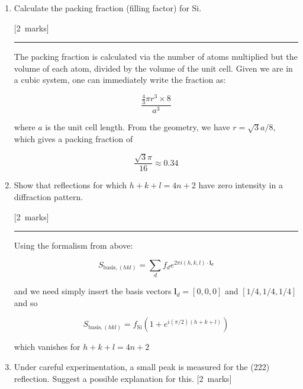 \documentclass[12pt,a4paper]{article}
\newcommand{\sepline}[0]{\par \hfil\rule{10cm}{0.4pt} \vspace*{\parskip}\hfil}
\begin{document}
\begin{enumerate}
\begin{enumerate}
\begin{enumerate}
\begin{answer}
						\end{answer}

						\item Calculate the packing fraction (filling factor) for Si.

						\hfill{[2~marks]}

						\begin{answer}

							\sepline

							The packing fraction is calculated via the number of atoms multiplied but the volume of each atom, divided by the volume of the unit cell. Given we are in a cubic system, one can immediately write the fraction as:

							$$
							\frac{\frac{4}{3}\pi r^3 \times 8}{a^3}
							$$

							where $a$ is the unit cell length. From the geometry, we have $r = \sqrt{3}a/8$, which gives a packing fraction of

							$$
							\frac{\sqrt{3}\pi}{16} \approx 0.34
							$$

						\end{answer}

						\item Show that reflections for which $h+k+l=4n+2$ have zero intensity in a diffraction pattern.

						\hfill{[2~marks]}

						\begin{answer}

							\sepline

							Using the formalism from above:

							$$
							S_{\mathrm{basis}, (hkl)} = \sum_d f_d e^{2\pi i (h,k,l)\cdot \mathbf{l}_d}
							$$

							and we need simply insert the basis vectors $\mathbf{l}_d=[0,0,0]$ and $[1/4, 1/4, 1/4]$ and so

							$$
							S_{\mathrm{basis}, (hkl)} = f_{\textrm{Si}}\left(1+e^{i(\pi/2)(h+k+l)} \right)
							$$

							which vanishes for $h+k+l=4n+2$
						\end{answer}

						\item Under careful experimentation, a small peak is measured for the (222) reflection. Suggest a possible explanation for this.
						\hfill{[2~marks]}

						\begin{answer}


\end{answer}
\end{enumerate}
\end{enumerate}
\end{enumerate}
\end{document}
